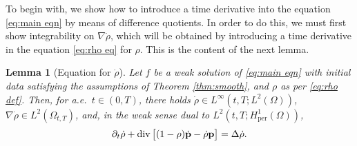 \documentclass[11pt,a4paper,reqno]{amsart}
\newtheorem{lemma}[prop]{Lemma}
\theoremstyle{remark}
\theoremstyle{definition}
\numberwithin{equation}{section}
\newcommand{\per}{\mathrm{per}}
\DeclareMathOperator{\dv}{div}
\newcommand{\p}{{\bf p}}
\begin{document}
To begin with, we show how to introduce a time derivative into the equation \eqref{eq:main eqn} by means of difference quotients. In order to do this, we must first show integrability on $\nabla \dot{\rho}$, which will be obtained by introducing a time derivative in the equation \eqref{eq:rho eq} for $\rho$. This is the content of the next lemma. 

\begin{lemma}[Equation for $\dot{\rho}$]\label{lem:eqn for dot rho}
    Let $f$ be a weak solution of \eqref{eq:main eqn} with initial data satisfying the assumptions of Theorem \ref{thm:smooth}, and $\rho$ as per \eqref{eq:rho def}. Then, for a.e.~$t \in (0,T)$, there holds $\dot{\rho} \in L^\infty(t,T;L^2(\Omega))$, $\nabla \dot{\rho} \in L^2(\Omega_{t,T})$, and, in the weak sense dual to $L^2(t,T;H^1_\per(\Omega))$, 
    \begin{equation}\label{eq:eqn for dot rho}
        \partial_t \dot{\rho} + \dv\big[ (1-\rho)\dot{\p} - \dot{\rho} \p \big] = \Delta \dot{\rho}. 
    \end{equation}
\end{lemma}
\end{document}

